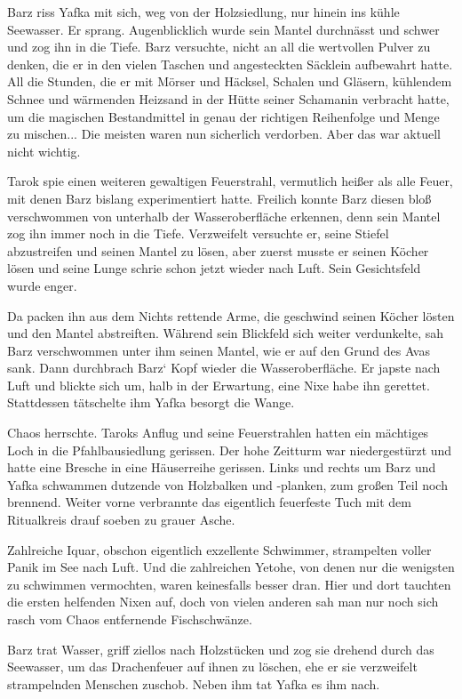 Barz riss Yafka mit sich, weg von der Holzsiedlung, nur hinein ins kühle Seewasser. Er sprang. Augenblicklich wurde sein Mantel durchnässt und schwer und zog ihn in die Tiefe. Barz versuchte, nicht an all die wertvollen Pulver zu denken, die er in den vielen Taschen und angesteckten Säcklein aufbewahrt hatte. All die Stunden, die er mit Mörser und Häcksel, Schalen und Gläsern, kühlendem Schnee und wärmenden Heizsand in der Hütte seiner Schamanin verbracht hatte, um die magischen Bestandmittel in genau der richtigen Reihenfolge und Menge zu mischen... Die meisten waren nun sicherlich verdorben. Aber das war aktuell nicht wichtig.

Tarok spie einen weiteren gewaltigen Feuerstrahl, vermutlich heißer als alle Feuer, mit denen Barz bislang experimentiert hatte. Freilich konnte Barz diesen bloß verschwommen von unterhalb der Wasseroberfläche erkennen, denn sein Mantel zog ihn immer noch in die Tiefe. Verzweifelt versuchte er, seine Stiefel abzustreifen und seinen Mantel zu lösen, aber zuerst musste er seinen Köcher lösen und seine Lunge schrie schon jetzt wieder nach Luft. Sein Gesichtsfeld wurde enger.

Da packen ihn aus dem Nichts rettende Arme, die geschwind seinen Köcher lösten und den Mantel abstreiften. Während sein Blickfeld sich weiter verdunkelte, sah Barz verschwommen unter ihm seinen Mantel, wie er auf den Grund des Avas sank. Dann durchbrach Barz‘ Kopf wieder die Wasseroberfläche. Er japste nach Luft und blickte sich um, halb in der Erwartung, eine Nixe habe ihn gerettet. Stattdessen tätschelte ihm Yafka besorgt die Wange.

Chaos herrschte. Taroks Anflug und seine Feuerstrahlen hatten ein mächtiges Loch in die Pfahlbausiedlung gerissen. Der hohe Zeitturm war niedergestürzt und hatte eine Bresche in eine Häuserreihe gerissen. Links und rechts um Barz und Yafka schwammen dutzende von Holzbalken und -planken, zum großen Teil noch brennend. Weiter vorne verbrannte das eigentlich feuerfeste Tuch mit dem Ritualkreis drauf soeben zu grauer Asche.

Zahlreiche Iquar, obschon eigentlich exzellente Schwimmer, strampelten voller Panik im See nach Luft. Und die zahlreichen Yetohe, von denen nur die wenigsten zu schwimmen vermochten, waren keinesfalls besser dran. Hier und dort tauchten die ersten helfenden Nixen auf, doch von vielen anderen sah man nur noch sich rasch vom Chaos entfernende Fischschwänze.

Barz trat Wasser, griff ziellos nach Holzstücken und zog sie drehend durch das Seewasser, um das Drachenfeuer auf ihnen zu löschen, ehe er sie verzweifelt strampelnden Menschen zuschob. Neben ihm tat Yafka es ihm nach.

